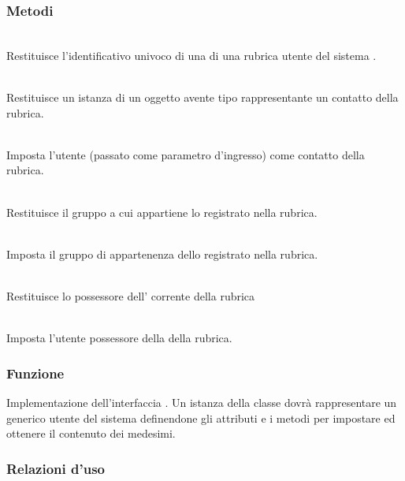 \subsubsection*{Metodi}
\begin{description}
	\item{}\\
	Restituisce l'identificativo univoco di una  di una rubrica utente del sistema \caName.
	\item{}\\
	Restituisce un istanza di un oggetto avente tipo  rappresentante un contatto della rubrica.
	\item{}\\
	Imposta l'utente  (passato come parametro d'ingresso) come contatto della rubrica.
	\item{}\\
	Restituisce il gruppo a cui appartiene lo  registrato nella rubrica.
	\item{}\\
	Imposta il gruppo di appartenenza dello  registrato nella rubrica.
	\item{}\\
	Restituisce lo  possessore dell' corrente della rubrica
	\item{}\\
	Imposta l'utente  possessore della  della rubrica.
\end{description}


\subsubsection*{Funzione}
Implementazione dell'interfaccia . Un istanza della classe dovrà rappresentare un generico utente del sistema definendone gli attributi e i metodi per impostare ed ottenere il contenuto dei medesimi.

\subsubsection*{Relazioni d'uso}

